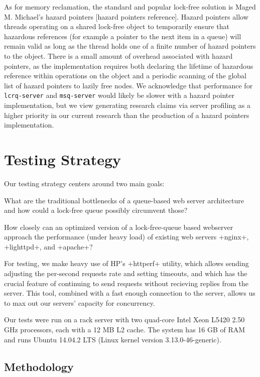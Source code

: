 \documentclass[twoside]{article}
\begin{document}
\begin{multicols}{2}
As for memory reclamation, the standard and popular lock-free solution
is Maged M. Michael's hazard pointers
[hazard pointers reference]. Hazard pointers allow threads operating
on a shared lock-free object to temporarily ensure that hazardous
references (for example a pointer to the next item in a queue) will
remain valid as long as the thread holds one of a finite number of
hazard pointers to the object. There is a small amount of overhead
associated with hazard pointers, as the implementation requires both
declaring the lifetime of hazardous reference within operations on the
object and a periodic scanning of the global list of hazard pointers
to lazily free nodes. We acknowledge that performance for
\verb+lcrq-server+ and \verb+msq-server+ would likely be slower with a hazard
pointer implementation, but we view generating research claims via
server profiling as a higher priority in our current research than the
production of a hazard pointers implementation.

\section{Testing Strategy}

Our testing strategy centers around two main goals:

\begin{compactitem}
\item What are the traditional bottlenecks of a queue-based web server
  architecture and how could a lock-free queue possibly circumvent
  those?
\item How closely can an optimized version of a lock-free-queue based
   webserver approach the performance (under heavy load) of existing
   web servers +nginx+, +lighttpd+, and +apache+?
\end{compactitem}

For testing, we make heavy use of HP's +httperf+ utility, which allows
sending adjusting the per-second requests rate and setting timeouts,
and which has the crucial feature of continuing to send requests
without recieving replies from the server. This tool, combined with a
fast enough connection to the server, allows us to max out our
servers' capacity for concurrency.

Our tests were run on a rack server with two quad-core Intel Xeon
L5420 2.50 GHz processors, each with a 12 MB L2 cache. The system has
16 GB of RAM and runs Ubuntu 14.04.2 LTS (Linux kernel version
3.13.0-46-generic).

\subsection{Methodology}

\end{multicols}
\end{document}
